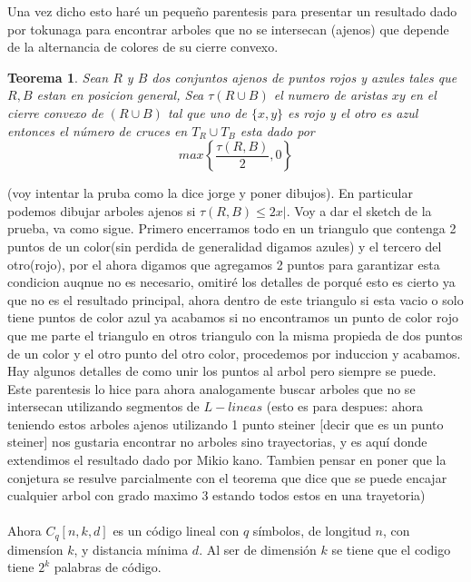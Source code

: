 \documentclass[11pt,a4paper]{article}
\newtheorem{theorem}{Teorema}
\begin{document}
Una vez dicho esto haré un pequeño parentesis para presentar un resultado dado por tokunaga para encontrar arboles que no se intersecan (ajenos) que depende de la alternancia de colores de su cierre convexo. 
\begin{theorem}
Sean $R$ y $B$ dos conjuntos ajenos de puntos rojos y azules tales que $R, B$ estan en posicion general, Sea $\tau\left( R \cup B \right)$ el numero de aristas $xy$ en el cierre convexo de $(R\cup B)$ tal que uno de $\lbrace x,y \rbrace$ es rojo y el otro es azul entonces el número de cruces en $T_{R} \cup T_{B}$ esta dado por $$max\left\lbrace \frac{\tau(R, B)}{2}, 0 \right\rbrace$$
\end{theorem}(voy intentar la pruba como la dice jorge y poner dibujos).
En particular podemos dibujar arboles ajenos si $\tau(R, B) \leq 2x|$. Voy a dar el sketch de la prueba, va como sigue. Primero encerramos todo en un triangulo que contenga 2 puntos de un color(sin perdida de generalidad digamos azules) y el tercero del otro(rojo), por el ahora digamos que agregamos 2 puntos para garantizar esta condicion auqnue no es necesario, omitiré los detalles de porqué esto es cierto ya que no es el resultado principal, ahora dentro de este triangulo si esta vacio o solo tiene puntos de color azul ya acabamos si no encontramos un punto de color rojo que me parte el triangulo en otros triangulo con la misma propieda de dos puntos de un color y el otro punto del otro color, procedemos por induccion y acabamos. Hay algunos detalles de como unir los puntos al arbol pero siempre se puede.
Este parentesis lo hice para ahora analogamente buscar arboles que no se intersecan utilizando segmentos de $L-lineas$ (esto es para despues: ahora teniendo estos arboles ajenos utilizando 1 punto steiner [decir que es un punto steiner] nos gustaria encontrar no arboles sino trayectorias, y es aquí donde extendimos el resultado dado por Mikio kano. Tambien pensar en poner que la conjetura se resulve parcialmente con el teorema que dice que se puede encajar cualquier arbol con grado maximo 3 estando todos estos en una trayetoria)
\\\\
Ahora $C_q[n,k,d]$ es un código lineal con $q$ símbolos, de longitud $n$, con dimensíon $k$, y distancia mínima $d$. 
Al ser de dimensión $k$ se tiene que el codigo tiene $2^{k}$ palabras de código.
\end{document}
